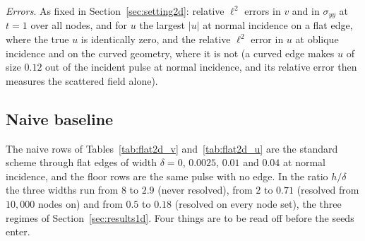 \documentclass[11pt]{amsart}
\theoremstyle{definition}
\theoremstyle{remark}
\newcommand{\para}[1]{\par\smallskip\noindent\textit{#1}.\enspace}
\begin{document}
\para{Errors}
As fixed in Section~\ref{sec:setting2d}: relative $\ell^2$ errors in $v$
and in $\sigma_{yy}$ at $t = 1$ over all nodes, and for $u$ the largest
$|u|$ at normal incidence on a flat edge, where the true $u$ is
identically zero, and the relative $\ell^2$ error in $u$ at oblique
incidence and on the curved geometry, where it is not (a curved edge
makes $u$ of size $0.12$ out of the incident pulse at normal incidence,
and its relative error then measures the scattered field alone).

\FloatBarrier
\subsection{Naive baseline}
\label{sec:naive2d}
The naive rows of Tables~\ref{tab:flat2d_v} and~\ref{tab:flat2d_u} are
the standard scheme through flat edges of width $\delta = 0$, $0.0025$,
$0.01$ and $0.04$ at normal incidence, and the floor rows are the same
pulse with no edge. In the ratio $h / \delta$ the three widths run from
$8$ to $2.9$ (never resolved), from $2$ to $0.71$ (resolved from
$10{,}000$ nodes on) and from $0.5$ to $0.18$ (resolved on every node
set), the three regimes of Section~\ref{sec:results1d}. Four things are
to be read off before the seeds enter.
\end{document}
